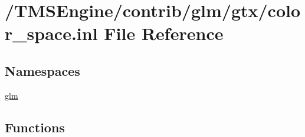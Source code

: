 \hypertarget{gtx_2color__space_8inl}{}\section{/\+T\+M\+S\+Engine/contrib/glm/gtx/color\+\_\+space.inl File Reference}
\label{gtx_2color__space_8inl}
\subsection*{Namespaces}
\begin{DoxyCompactItemize}
\item 
 \hyperlink{namespaceglm}{glm}
\end{DoxyCompactItemize}
\subsection*{Functions}
